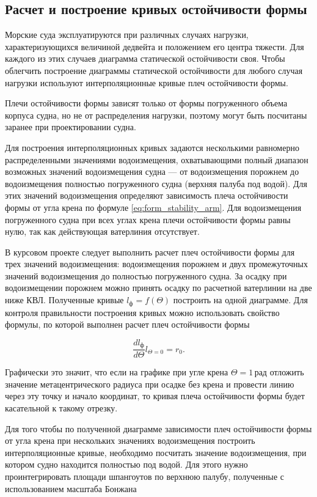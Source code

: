 \subsection{Расчет и построение кривых остойчивости формы}

Морские суда эксплуатируются при различных случаях нагрузки, характеризующихся величиной дедвейта и положением его центра тяжести.
Для каждого из этих случаев диаграмма статической остойчивости своя.
Чтобы облегчить построение диаграммы статической остойчивости для любого случая нагрузки используют интерполяционные кривые плеч остойчивости формы.

Плечи остойчивости формы зависят только от формы погруженного объема корпуса судна, но не от распределения нагрузки, поэтому могут быть посчитаны заранее при проектировании судна.

Для построения интерполяционных кривых задаются несколькими равномерно распределенными значениями водоизмещения, охватывающими полный диапазон возможных значений водоизмещения судна --- от водоизмещения порожнем до водоизмещения полностью погруженного судна (верхняя палуба под водой).
Для этих значений водоизмещения определяют зависимость плеча остойчивости формы от угла крена по формуле \ref{eq:form_stability_arm}.
Для водоизмещения погруженного судна при всех углах крена плечи остойчивости формы равны нулю, так как действующая ватерлиния отсутствует.

В курсовом проекте следует выполнить расчет плеч остойчивости формы для трех значений водоизмещения:
водоизмещения порожнем и двух промежуточных значений водоизмещения до полностью погруженного судна.
За осадку при водоизмещении порожнем можно принять осадку по расчетной ватерлинии на две ниже КВЛ.
Полученные кривые $l_{\text{ф}}=f(\Theta)$ построить на одной диаграмме. 
Для контроля правильности построения кривых можно использовать свойство формулы, по которой выполнен расчет плеч остойчивости формы

\begin{equation}
    \frac{d l_{\text{ф}}}{d\Theta} l_{\Theta = 0} = r_0.
\end{equation}

Графически это значит, что если на графике при угле крена $\Theta = 1\,\text{рад}$ отложить значение метацентрического радиуса при осадке без крена и провести линию через эту точку и начало координат, то кривая плеча остойчивости формы будет касательной к такому отрезку.

Для того чтобы по полученной диаграмме зависимости плеч остойчивости формы от угла крена при нескольких значениях водоизмещения построить интерполяционные кривые, необходимо посчитать значение водоизмещения, при котором судно находится полностью под водой.
Для этого нужно проинтегрировать площади шпангоутов по верхнюю палубу, полученные с использованием масштаба Бонжана


